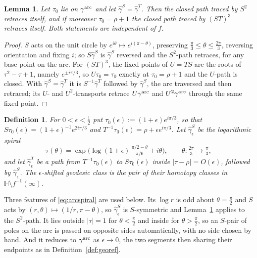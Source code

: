 \documentclass[11pt]{article}
\newtheorem{lemma}[theorem]{Lemma}
\newtheorem{definition}[theorem]{Definition}
\newcommand{\HH}{\mathbb{H}}
\begin{document}
\begin{lemma}\label{lem:georetrace}
Let $\tau_0$ lie on $\gamma^{\rm arc}$ and let $\hat\gamma^S=\hat\gamma^T$. Then the closed path
traced by $S^2$ retraces itself, and if moreover $\tau_0=\rho+1$ the closed path traced by
$(ST)^3$ retraces itself. Both statements are independent of $f$.
\end{lemma}

\begin{proof}
$S$ acts on the unit circle by $e^{i\theta}\mapsto e^{i(\pi-\theta)}$, preserving
$\tfrac{\pi}{3}\le\theta\le\tfrac{2\pi}{3}$, reversing orientation and fixing $i$; so
$S\hat\gamma^S$ is $\hat\gamma^S$ reversed and the $S^2$-path retraces, for any base point on the
arc. For $(ST)^3$, the fixed points of $U=TS$ are the roots of $\tau^2-\tau+1$, namely
$e^{\pm i\pi/3}$, so $U\tau_0=\tau_0$ exactly at $\tau_0=\rho+1$ and the $U$-path is closed. With
$\hat\gamma^S=\hat\gamma^T$ it is $S^{-1}\hat\gamma^T$ followed by $\hat\gamma^S$, the arc
traversed and then retraced; its $U$- and $U^2$-transports retrace $U\gamma^{\rm arc}$ and
$U^2\gamma^{\rm arc}$ through the same fixed point.
\end{proof}

\begin{definition}\label{def:arcshift}
For $0<\epsilon<\tfrac12$ put $\tau_0(\epsilon):=(1+\epsilon)e^{i\pi/3}$, so that
$S\tau_0(\epsilon)=(1+\epsilon)^{-1}e^{2i\pi/3}$ and $T^{-1}\tau_0(\epsilon)=\rho+\epsilon
e^{i\pi/3}$. Let $\hat\gamma^S_\epsilon$ be the logarithmic spiral
\begin{equation}\label{eq:arcspiral}
\tau(\theta)=\exp\Big(\log(1+\epsilon)\,\tfrac{\pi/2-\theta}{\pi/6}+i\theta\Big),
\qquad \theta:\tfrac{2\pi}{3}\to\tfrac{\pi}{3},
\end{equation}
and let $\hat\gamma^T_\epsilon$ be a path from $T^{-1}\tau_0(\epsilon)$ to $S\tau_0(\epsilon)$
inside $|\tau-\rho|=O(\epsilon)$, followed by $\hat\gamma^S_\epsilon$. The
\emph{$\epsilon$-shifted geodesic class} is the pair of their homotopy classes in
$\HH\setminus f^{-1}(\infty)$.
\end{definition}

Three features of \eqref{eq:arcspiral} are used below. Its $\log r$ is odd about
$\theta=\tfrac{\pi}{2}$ and $S$ acts by $(r,\theta)\mapsto(1/r,\pi-\theta)$, so
$\hat\gamma^S_\epsilon$ is $S$-symmetric and Lemma~\ref{lem:georetrace} applies to the
$S^2$-path. It lies outside $|\tau|=1$ for $\theta<\tfrac{\pi}{2}$ and inside for
$\theta>\tfrac{\pi}{2}$, so an $S$-pair of poles on the arc is passed on opposite sides
automatically, with no side chosen by hand. And it reduces to $\gamma^{\rm arc}$ as
$\epsilon\to0$, the two segments then sharing their endpoints as in
Definition~\ref{def:georef}.
\end{document}

